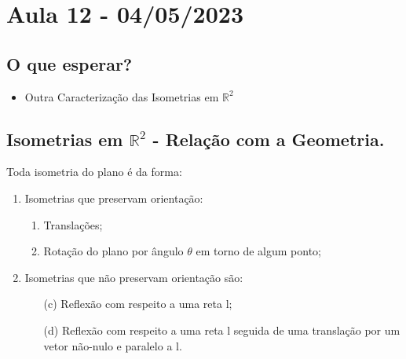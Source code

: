 \documentclass[algebra_notes.tex]{subfiles}
\begin{document}
\section{Aula 12 - 04/05/2023}
\subsection{O que esperar?}
\begin{itemize}
	\item Outra Caracterização das Isometrias em $\mathbb{R}^{2}$
\end{itemize}
\subsection{Isometrias em $\mathbb{R}^{2}$ - Relação com a Geometria.}
\begin{theorem*}
	Toda isometria do plano é da forma:
	\begin{enumerate}
		\item Isometrias que preservam orientação:
		      \begin{enumerate}
			      \item Translações;
			      \item Rotação do plano por ângulo $\theta $ em torno de algum ponto;
		      \end{enumerate}
		\item Isometrias que não preservam orientação são:
		      \begin{enumerate}
			      \item[(c)] Reflexão com respeito a uma reta l;
			      \item[(d)] Reflexão com respeito a uma reta l seguida de uma translação por um vetor não-nulo e
			            paralelo a l.
		      \end{enumerate}
	\end{enumerate}
\end{theorem*}
\end{document}
